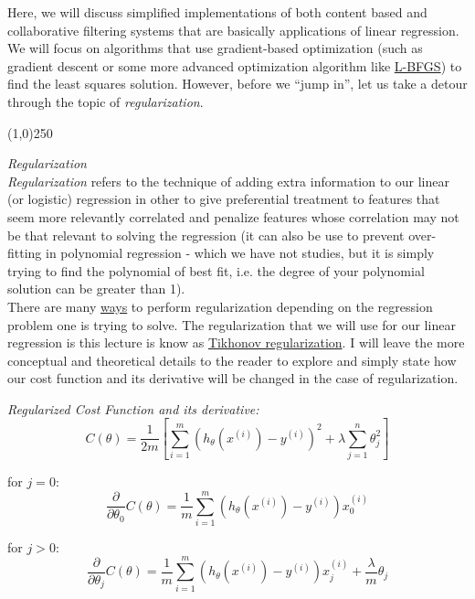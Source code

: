 \documentclass[11pt,a4paper,oneside]{report}
\begin{document}
Here, we will discuss simplified implementations of both content based and collaborative filtering systems that are basically applications of linear regression. We will focus on algorithms that use gradient-based optimization (such as gradient descent or some more advanced optimization algorithm like \href{https://en.wikipedia.org/wiki/L-BFGS}{L-BFGS}) to find the least squares solution. However, before we ``jump in'', let us take a detour through the topic of \emph{regularization}.\\

\begin{center}
\line(1,0){250}
\end{center}

{\color{red}\it\Large Regularization}\\

\emph{Regularization} refers to the technique of adding extra information to our linear (or logistic) regression in other to give preferential treatment to features that seem more relevantly correlated and penalize features whose correlation may not be that relevant to solving the regression (it can also be use to prevent over-fitting in polynomial regression - which we have not studies, but it is simply trying to find the polynomial of best fit, i.e. the degree of your polynomial solution can be greater than 1). \\

There are many \href{https://en.wikipedia.org/wiki/Regularization_(mathematics)}{ways} to perform regularization depending on the regression problem one is trying to solve. The regularization that we will use for our linear regression is this lecture is know as \href{https://en.wikipedia.org/wiki/Ridge_regression}{Tikhonov regularization}. I will leave the more conceptual and theoretical details to the reader to explore and simply state how our cost function and its derivative will be changed in the case of regularization.\\
\newpage

\begin{framed}
{\it Regularized Cost Function and its derivative:}
\[
C(\theta) = \frac{1}{2m}\left[\sum_{i = 1}^m(h_{\theta}(x^{(i)}) - y^{(i)})^2 + \lambda\sum_{j=1}^n \theta_j^2\right]
\]

for $j=0$:
\[
\frac{\partial}{\partial \theta_0}C(\theta) = \frac{1}{m}\sum_{i=1}^m(h_{\theta}(x^{(i)})-y^{(i)})x^{(i)}_0
\]

for $j > 0$:
\[
\frac{\partial}{\partial \theta_j}C(\theta) = \frac{1}{m}\sum_{i=1}^m(h_{\theta}(x^{(i)})-y^{(i)})x^{(i)}_j + \frac{\lambda}{m}\theta_j
\]
\end{framed}
\end{document}
